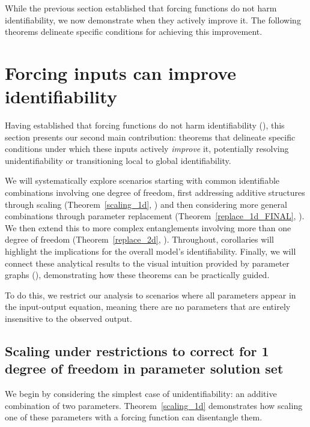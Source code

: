 \documentclass[a4paper,fleqn]{cas-dc}
\theoremstyle{definition}
\begin{document}
While the previous section established that forcing functions do not harm identifiability, we now demonstrate when they actively improve it. The following theorems delineate specific conditions for achieving this improvement.

\section{Forcing inputs can improve identifiability} \label{s:forcefunc}
\noindent Having established that forcing functions do not harm identifiability (), this section presents our second main contribution: theorems that delineate specific conditions under which these inputs actively \textit{improve} it, potentially resolving unidentifiability or transitioning local to global identifiability. 

We will systematically explore scenarios starting with common identifiable combinations involving one degree of freedom, first addressing additive structures through scaling (Theorem~\ref{scaling_1d}, ) and then considering more general combinations through parameter replacement (Theorem~\ref{replace_1d_FINAL}, ). We then extend this to more complex entanglements involving more than one degree of freedom (Theorem~\ref{replace_2d}, ). Throughout, corollaries will highlight the implications for the overall model's identifiability. Finally, we will connect these analytical results to the visual intuition provided by parameter graphs (), demonstrating how these theorems can be practically guided. 

To do this, we restrict our analysis to scenarios where all parameters appear in the input-output equation, meaning there are no parameters that are entirely insensitive to the observed output.

\subsection{Scaling under restrictions to correct for 1 degree of freedom in parameter solution set} \label{s:scaling_1dof}
\noindent We begin by considering the simplest case of unidentifiability: an additive combination of two parameters. Theorem~\ref{scaling_1d} demonstrates how scaling one of these parameters with a forcing function can disentangle them.
\end{document}
